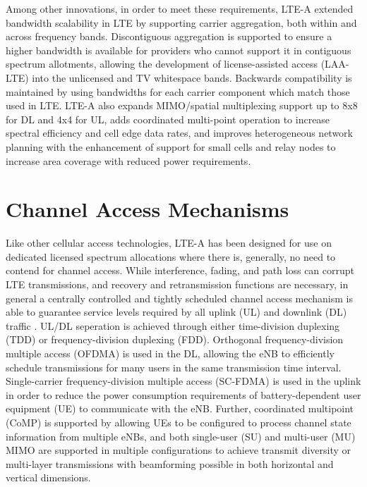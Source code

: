 Among other innovations, in order to meet these requirements, LTE-A extended bandwidth scalability in LTE by supporting carrier aggregation, both within and across frequency bands.   Discontiguous aggregation is supported to ensure a higher bandwidth is available for providers who cannot support it in contiguous spectrum allotments, allowing the development of license-assisted access (LAA-LTE) into the unlicensed and TV whitespace bands.  Backwards compatibility is maintained by using bandwidths for each carrier component which match those used in LTE.  LTE-A also expands MIMO/spatial multiplexing support up to 8x8 for DL and 4x4 for UL, adds coordinated multi-point operation to increase spectral efficiency and cell edge data rates, and improves heterogeneous network planning with the enhancement of support for small cells and relay nodes to increase area coverage with reduced power requirements.

\section{Channel Access Mechanisms}
\label{channel-access}
Like other cellular access technologies, LTE-A has been designed for use on dedicated licensed spectrum allocations where there is, generally, no need to contend for channel access.  While interference, fading, and path loss can corrupt LTE transmissions, and recovery and retransmission functions are necessary, in general a centrally controlled and tightly scheduled channel access mechanism is able to guarantee service levels required by all uplink (UL) and downlink (DL) traffic \cite{tr36300}. UL/DL seperation is achieved through either time-division duplexing (TDD) or frequency-division duplexing (FDD).  Orthogonal frequency-division multiple access (OFDMA) is used in the DL, allowing the eNB to efficiently schedule transmissions for many users in the same transmission time interval.  Single-carrier frequency-division multiple access (SC-FDMA) is used in the uplink in order to reduce the power consumption requirements of battery-dependent user equipment (UE) to communicate with the eNB.  Further, coordinated multipoint (CoMP) is supported by allowing UEs to be configured to process channel state information from multiple eNBs, and both single-user (SU) and multi-user (MU) MIMO are supported in multiple configurations to achieve transmit diversity or multi-layer transmissions with beamforming possible in both horizontal and vertical dimensions.

